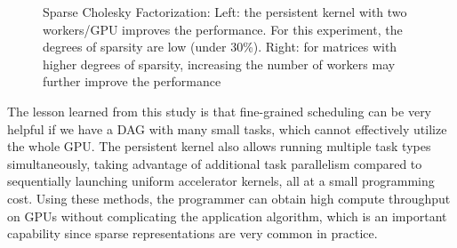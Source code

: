 \begin{figure}[htb]
\centering
{} \hspace{1cm}
\caption{Sparse Cholesky Factorization: Left: the persistent kernel with two workers/GPU improves the performance. For this experiment, the degrees of sparsity are low (under 30\%). Right: for matrices with higher degrees of sparsity, increasing the number of workers  may further improve the performance}
\label{fig:coarseFine}
\end{figure}

The lesson learned from this study is that fine-grained scheduling can be very helpful if we have a DAG with many small tasks, which cannot effectively utilize the whole GPU.
The persistent kernel also allows running multiple task types simultaneously, taking advantage of additional task parallelism compared to sequentially launching uniform accelerator kernels, all at a small programming cost.
Using these methods, the programmer can obtain high compute throughput on GPUs without complicating the application algorithm, which is an important capability since sparse representations are very common in practice.


